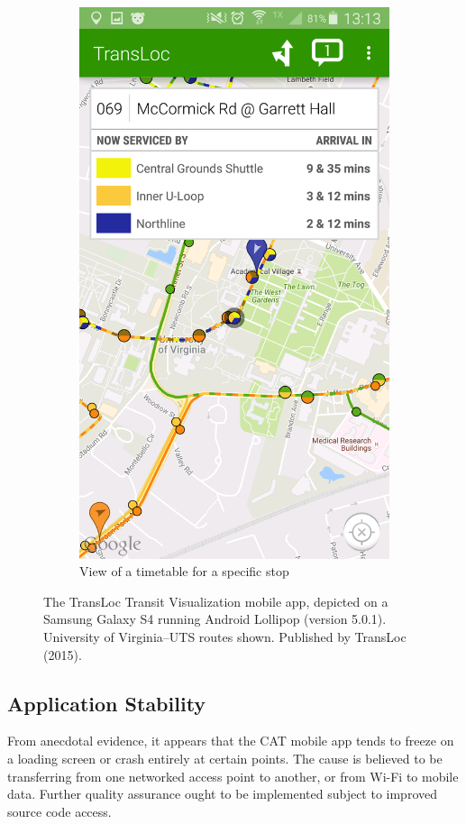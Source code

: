 \documentclass[12pt,letterpaper]{article}
\begin{document}
\begin{figure}[ph!]
\begin{subfigure}{.5\textwidth}
  \includegraphics[width=.9\linewidth]{TL_mobile_2}
  \caption{View of a timetable for a specific stop}
  \label{fig:TL_mobile_2}
\end{subfigure}
    \caption{The TransLoc Transit Visualization mobile app, depicted on a Samsung Galaxy S4 running Android Lollipop (version 5.0.1). University of Virginia--UTS routes shown. Published by TransLoc (2015).}
\label{fig:TL_mobile}
\end{figure}

\subsection{Application Stability}
From anecdotal evidence, it appears that the CAT mobile app tends to freeze on
a loading screen or crash entirely at certain points. The cause is believed to be transferring from one networked access point to another, or from Wi-Fi to mobile data. Further quality assurance ought to be implemented subject to improved source code access.
\end{document}
